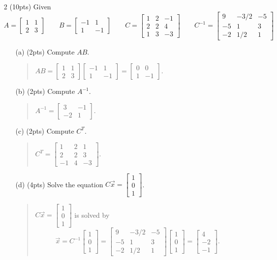 \documentclass{article}
\newcommand{\mat}[1]{\begin{bmatrix}#1\end{bmatrix}}
\begin{document}
\begin{enumerate}
	\item[2 (10pts)] Given
		\[
			A=\mat{1&1\\2&3}\qquad
			B=\mat{-1&1\\1&-1}\qquad
			C=\mat{1&2&-1\\2&2&4\\1&3&-3}\qquad
			C^{-1}=\mat{9&-3/2&-5\\-5&1&3\\-2&1/2&1}
		\]
	\begin{enumerate}
		\item[(a) (2pts)] Compute $AB$.
		\begin{quote}
			$AB=\mat{1&1\\2&3}\mat{-1&1\\1&-1}=\mat{0&0\\1&-1}$.
		\end{quote}
			\vspace{1.5in}
		\item[(b) (2pts)] Compute $A^{-1}$.
		\begin{quote}
			$A^{-1}=\mat{3&-1\\-2&1}$.
		\end{quote}
			\vspace{1.5in}
		\item[(c) (2pts)] Compute $C^T$.
		\begin{quote}
			$C^T=\mat{1&2&1\\2&2&3\\-1&4&-3}$.
		\end{quote}
			\vspace{1.5in}
		\item[(d) (4pts)] Solve the equation $C\vec x=\mat{1\\0\\1}$.
		\begin{quote}
			$C\vec x=\mat{1\\0\\1}$ is solved by 
			\[
			\vec x=C^{-1}
			\mat{1\\0\\1}=
			\mat{9&-3/2&-5\\-5&1&3\\-2&1/2&1}
			\mat{1\\0\\1} = \mat{4\\-2\\-1}.
			\]
		\end{quote}
		
	
	\end{enumerate}
	\clearpage
	

\end{enumerate}
\end{document}
